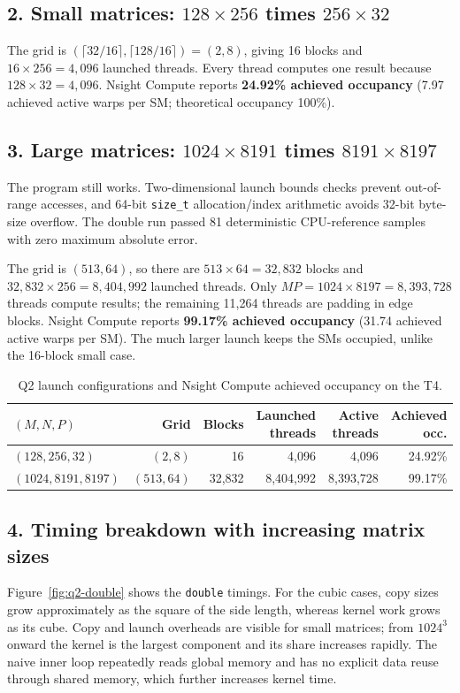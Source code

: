 \documentclass[11pt,a4paper]{article}
\begin{document}
\subsection*{2. Small matrices: \(128\times256\) times \(256\times32\)}
The grid is \((\lceil32/16\rceil,\lceil128/16\rceil)=(2,8)\), giving 16 blocks and \(16\times256=4{,}096\) launched threads. Every thread computes one result because \(128\times32=4{,}096\). Nsight Compute reports \textbf{24.92\% achieved occupancy} (7.97 achieved active warps per SM; theoretical occupancy 100\%).

\subsection*{3. Large matrices: \(1024\times8191\) times \(8191\times8197\)}
The program still works. Two-dimensional launch bounds checks prevent out-of-range accesses, and 64-bit \texttt{size\_t} allocation/index arithmetic avoids 32-bit byte-size overflow. The double run passed 81 deterministic CPU-reference samples with zero maximum absolute error.

The grid is \((513,64)\), so there are \(513\times64=32{,}832\) blocks and \(32{,}832\times256=8{,}404{,}992\) launched threads. Only \(MP=1024\times8197=8{,}393{,}728\) threads compute results; the remaining 11,264 threads are padding in edge blocks. Nsight Compute reports \textbf{99.17\% achieved occupancy} (31.74 achieved active warps per SM). The much larger launch keeps the SMs occupied, unlike the 16-block small case.

\begin{table}[H]
\centering
\small
\begin{tabular}{@{}lrrrrr@{}}
\toprule
\((M,N,P)\) & Grid & Blocks & Launched threads & Active threads & Achieved occ. \\
\midrule
\((128,256,32)\) & \((2,8)\) & 16 & 4,096 & 4,096 & 24.92\% \\
\((1024,8191,8197)\) & \((513,64)\) & 32,832 & 8,404,992 & 8,393,728 & 99.17\% \\
\bottomrule
\end{tabular}
\caption{Q2 launch configurations and Nsight Compute achieved occupancy on the T4.}
\label{tab:q2-launch}
\end{table}

\subsection*{4. Timing breakdown with increasing matrix sizes}
Figure~\ref{fig:q2-double} shows the \texttt{double} timings. For the cubic cases, copy sizes grow approximately as the square of the side length, whereas kernel work grows as its cube. Copy and launch overheads are visible for small matrices; from \(1024^3\) onward the kernel is the largest component and its share increases rapidly. The naive inner loop repeatedly reads global memory and has no explicit data reuse through shared memory, which further increases kernel time.
\end{document}
